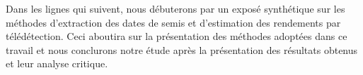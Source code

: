 \vspace{5mm} %

Dans les lignes qui suivent, nous débuterons par un exposé synthétique sur les méthodes d'extraction des dates de semis et d'estimation des rendements par télédétection. 
Ceci aboutira sur la présentation des méthodes adoptées dans ce travail et nous conclurons notre étude après la présentation des résultats obtenus et leur analyse critique.
